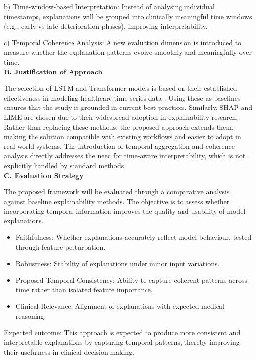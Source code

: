 \documentclass[conference]{IEEEtran}
\begin{document}
b) Time-window-based Interpretation: Instead of analysing individual timestamps, explanations will be grouped into clinically meaningful time windows (e.g., early vs late deterioration phases), improving interpretability.

c) Temporal Coherence Analysis: A new evaluation dimension is introduced to measure whether the explanation patterns evolve smoothly and meaningfully over time.\\

\textbf{B. Justification of Approach}

The selection of LSTM and Transformer models is based on their established effectiveness in modeling healthcare time series data \cite{lipton2015lstm, lim2021temporal}. Using these as baselines ensures that the study is grounded in current best practices. Similarly, SHAP and LIME are chosen due to their widespread adoption in explainability research. Rather than replacing these methods, the proposed approach extends them, making the solution compatible with existing workflows and easier to adopt in real-world systems.
The introduction of temporal aggregation and coherence analysis directly addresses the need for time-aware interpretability, which is not explicitly handled by standard methods.\\

\textbf{C. Evaluation Strategy}

The proposed framework will be evaluated through a comparative analysis against baseline explainability methods. The objective is to assess whether incorporating temporal information improves the quality and usability of model explanations.

\begin{itemize}
    \item Faithfulness: Whether explanations accurately reflect model behaviour, tested through feature perturbation.
    \item Robustness: Stability of explanations under minor input variations.
    \item Proposed Temporal Consistency: Ability to capture coherent patterns across time rather than isolated feature importance.
    \item Clinical Relevance: Alignment of explanations with expected medical reasoning.
\end{itemize}
Expected outcome: This approach is expected to produce more consistent and interpretable explanations by capturing temporal patterns, thereby improving their usefulness in clinical decision-making.
\end{document}
